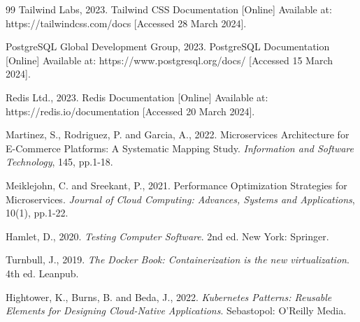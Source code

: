 \begin{thebibliography}{99}
Tailwind Labs, 2023. Tailwind CSS Documentation [Online] Available at: https://tailwindcss.com/docs [Accessed 28 March 2024].

PostgreSQL Global Development Group, 2023. PostgreSQL Documentation [Online] Available at: https://www.postgresql.org/docs/ [Accessed 15 March 2024].

Redis Ltd., 2023. Redis Documentation [Online] Available at: https://redis.io/documentation [Accessed 20 March 2024].

Martinez, S., Rodriguez, P. and Garcia, A., 2022. Microservices Architecture for E-Commerce Platforms: A Systematic Mapping Study. \textit{Information and Software Technology}, 145, pp.1-18.

Meiklejohn, C. and Sreekant, P., 2021. Performance Optimization Strategies for Microservices. \textit{Journal of Cloud Computing: Advances, Systems and Applications}, 10(1), pp.1-22.

Hamlet, D., 2020. \textit{Testing Computer Software}. 2nd ed. New York: Springer.

Turnbull, J., 2019. \textit{The Docker Book: Containerization is the new virtualization}. 4th ed. Leanpub.

Hightower, K., Burns, B. and Beda, J., 2022. \textit{Kubernetes Patterns: Reusable Elements for Designing Cloud-Native Applications}. Sebastopol: O'Reilly Media.

\end{thebibliography}
